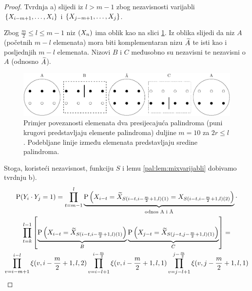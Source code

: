 \begin{proof}

	Tvrdnja a) slijedi iz $l>m-1$ zbog nezavisnosti varijabli
	$\{\tsvar{X}_{i-m+1},\ldots,\tsvar{X}_i\}$ i
	$\{\tsvar{X}_{j-m+1},\ldots,\tsvar{X}_j\}$.

	Zbog $\frac{m}{2} \leq l \leq m-1$ niz $(\tsvar{X}_n)$ ima oblik kao na slici
	\ref{pal:fig:l_vecejednako_k}.
	Iz oblika slijedi da niz $A$ (početnih $m-l$ elemenata)
	mora biti komplementaran nizu $\widetilde{A}$ te isti kao
	i posljednjih $m-l$ elemenata. Nizovi $B$ i $C$
	međusobno su nezavisni te nezavisni o $A$ (odnosno $\widetilde{A}$).

\begin{figure}[htb!]
\centering%
\includegraphics[scale = 0.8]{poglavlja/palindromi/slike/l_vecejednako_k-crop.pdf}
\caption{Primjer povezanosti elemenata dva presijecajuća palindroma (puni krugovi
	predstavljaju elemente palindroma) duljine $m=10$ za $2r \leq l$. Podebljane
	linije između elemenata predstavljaju sredine palindroma.}
\label{pal:fig:l_vecejednako_k}
\end{figure}

	\noindent
	Stoga, koristeći nezavisnost, funkciju $S$ i lemu \ref{pal:lem:mixvarijabli} dobivamo
	tvrdnju b).
%
\begin{multline*}
	\vP (\tsvar{Y}_i \cdot \tsvar{Y}_j =1 ) = 
	\prod_{t=m-1}^{l}
	\underbrace{
		\vP \left(
		\tsvar{X}_{i-t} =
		\ol{X}_{S(i-t, i-\frac{m}{2}+1, l)(1)} = 
		\tsvar{X}_{S(i-t, i-\frac{m}{2}+1, l)(2)} 
		\right)
	}_{\text{odnos A i \~A}}
	\cdot \\
	\prod_{t=k}^{l-1}
	\left[
		\underbrace{
		\vP \left(
		\tsvar{X}_{i-t} =
		\ol{X}_{S(i-t, i-\frac{m}{2}+1, l)(1)}
		\right)
		}_{B}
		\underbrace{
		\vP \left(
		\tsvar{X}_{j-t} =
		\ol{X}_{S(j-t, j-\frac{m}{2}+1, l)(1)}
		\right)
		}_{C}
	\right] = \\
		\prod_{v=i-m+1}^{i-l}
		\xi(v, i-\frac{m}{2}+1, l, 2) 
		\prod_{v=i-l+1}^{i-\frac{m}{2}}
		\xi(v, i-\frac{m}{2}+1, l, 1) 
		\prod_{v=j-l+1}^{j-\frac{m}{2}}
		\xi(v, j-\frac{m}{2}+1, l, 1) 
\end{multline*}


\end{proof}
